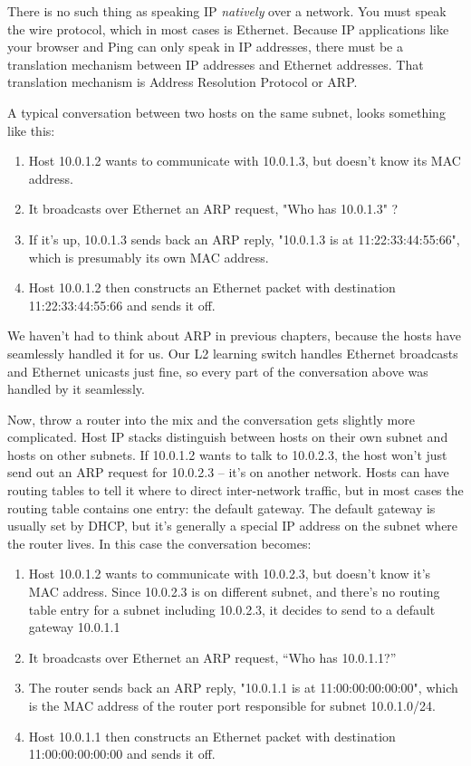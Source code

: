 There is no such thing as speaking IP \emph{natively} over a network.  You must speak the wire protocol,
which in most cases is Ethernet.  Because IP applications like your browser and Ping can only speak
in IP addresses, there must be a translation mechanism between IP addresses and Ethernet addresses.
That translation mechanism is Address Resolution Protocol or ARP.  

A typical conversation between two hosts on the same subnet, looks something like this:

\begin{enumerate}
\item Host 10.0.1.2 wants to communicate with 10.0.1.3, but doesn't know its MAC address.
\item It broadcasts over Ethernet an ARP request, "Who has 10.0.1.3" ?
\item If it's up, 10.0.1.3 sends back an ARP reply, "10.0.1.3 is at 11:22:33:44:55:66", which is
presumably its own MAC address.
\item Host 10.0.1.2 then constructs an Ethernet packet with destination 11:22:33:44:55:66 and sends it off.
\end{enumerate}

We haven't had to think about ARP in previous chapters, because the hosts have seamlessly handled it
for us.  Our L2 learning switch handles Ethernet broadcasts and Ethernet unicasts just fine, so every
part of the conversation above was handled by it seamlessly.

Now, throw a router into the mix and the conversation gets slightly more complicated.  Host IP
stacks distinguish between hosts on their own subnet and hosts on other subnets.  If
10.0.1.2 wants to talk to 10.0.2.3, the host won't just send out an ARP request for 10.0.2.3 -- it's
on another network.  Hosts can have routing tables to tell it where to direct inter-network
traffic, but in most cases the routing table contains one entry: the default gateway.  The default
gateway is usually set by DHCP, but it's generally a special IP address on the subnet where the
router lives. In this case the conversation becomes:

\begin{enumerate}
\item Host 10.0.1.2 wants to communicate with 10.0.2.3, but doesn't know it's MAC address.  Since
10.0.2.3 is on different subnet, and there's no routing table entry for a subnet including 10.0.2.3,
it decides to send to a default gateway 10.0.1.1
\item It broadcasts over Ethernet an ARP request, ``Who has 10.0.1.1?''
\item The router sends back an ARP reply, "10.0.1.1 is at 11:00:00:00:00:00", which is
the MAC address of the router port responsible for subnet 10.0.1.0/24.
\item Host 10.0.1.1 then constructs an Ethernet packet with destination 11:00:00:00:00:00 and sends it off.
\end{enumerate}

